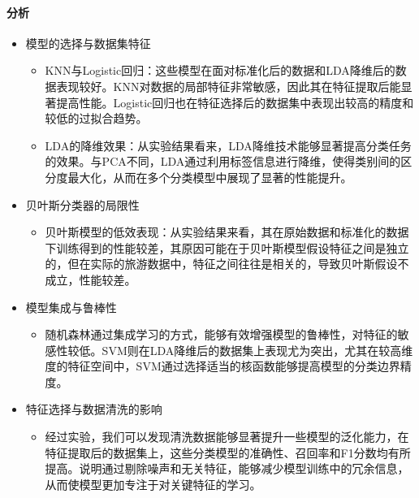 \documentclass[10pt]{article}
\begin{document}
\paragraph{分析}
\begin{itemize}
  \item 模型的选择与数据集特征
  \begin{itemize}
    \item KNN与Logistic回归：这些模型在面对标准化后的数据和LDA降维后的数据表现较好。KNN对数据的局部特征非常敏感，因此其在特征提取后能显著提高性能。Logistic回归也在特征选择后的数据集中表现出较高的精度和较低的过拟合趋势。
    \item LDA的降维效果：从实验结果看来，LDA降维技术能够显著提高分类任务的效果。与PCA不同，LDA通过利用标签信息进行降维，使得类别间的区分度最大化，从而在多个分类模型中展现了显著的性能提升。
  \end{itemize}
  \item 贝叶斯分类器的局限性
  \begin{itemize}
    \item 贝叶斯模型的低效表现：从实验结果来看，其在原始数据和标准化的数据下训练得到的性能较差，其原因可能在于贝叶斯模型假设特征之间是独立的，但在实际的旅游数据中，特征之间往往是相关的，导致贝叶斯假设不成立，性能较差。
  \end{itemize}
  \item 模型集成与鲁棒性
  \begin{itemize}
    \item 随机森林通过集成学习的方式，能够有效增强模型的鲁棒性，对特征的敏感性较低。SVM则在LDA降维后的数据集上表现尤为突出，尤其在较高维度的特征空间中，SVM通过选择适当的核函数能够提高模型的分类边界精度。
  \end{itemize}
  \item 特征选择与数据清洗的影响
  \begin{itemize}
    \item 经过实验，我们可以发现清洗数据能够显著提升一些模型的泛化能力，在特征提取后的数据集上，这些分类模型的准确性、召回率和F1分数均有所提高。说明通过剔除噪声和无关特征，能够减少模型训练中的冗余信息，从而使模型更加专注于对关键特征的学习。
  \end{itemize}
\end{itemize}
\end{document}
